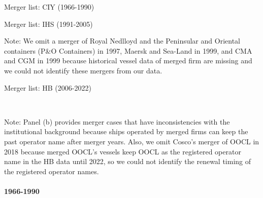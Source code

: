 \documentclass[10pt]{article}
\begin{document}
\begin{table}[!htbp]
  \begin{center}
      \caption{Merger list: CIY (1966-1990)}
      \label{tb:merger_list_CIY} 
      
  \end{center}\footnotesize
\end{table} 

\begin{table}[!htbp]
  \begin{center}
      \caption{Merger list: IHS (1991-2005)}
      \label{tb:merger_list_IHS} 
      
  \end{center}\footnotesize
  Note: We omit a merger of Royal Nedlloyd and the Peninsular and Oriental containers (P\&O Containers) in 1997, Maersk and Sea-Land in 1999, and CMA and CGM in 1999 because historical vessel data of merged firm are missing and we could not identify these mergers from our data.
\end{table} 

\begin{table}[!htbp]
  \begin{center}
      \caption{Merger list: HB (2006-2022)}
      \label{tb:merger_list_HB} 
      \subfloat[HB (2006-2022)]{}\\
  \end{center}\footnotesize
  Note: Panel (b) provides merger cases that have inconsistencies with the institutional background because ships operated by merged firms can keep the past operator name after merger years. Also, we omit Cosco's merger of OOCL in 2018 because merged OOCL's vessels keep OOCL as the registered operator name in the HB data until 2022, so we could not identify the renewal timing of the registered operator names.
\end{table} 

\paragraph{1966-1990} 
\end{document}
